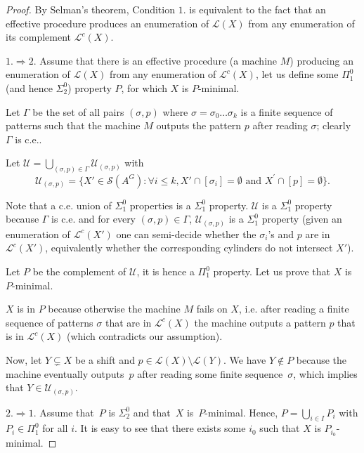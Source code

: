\documentclass[french,american]{article}
\theoremstyle{plain}
\theoremstyle{definition}
\theoremstyle{remark}
\theoremstyle{plain}
\begin{document}
\begin{proof}
By Selman's theorem, Condition $1.$ is equivalent to the fact that an effective procedure produces an enumeration of
$\mathcal{L}(X)$ from any enumeration of its complement $\mathcal{L}^{c}(X)$.

$1.\Rightarrow2$. Assume that there is an effective procedure (a
machine $M$) producing an enumeration of $\mathcal{L}(X)$ from any
enumeration of $\mathcal{L}^{c}(X)$, let us define some $\Pi_{1}^{0}$
(and hence $\Sigma_{2}^{0}$) property $P$, for which $X$ is $P$-minimal. 

Let $\varGamma$ be the set of all pairs $(\sigma,p)$ where $\sigma=\sigma_{0}\ldots\sigma_{k}$
is a finite sequence of patterns such that the machine $M$ outputs
the pattern $p$ after reading $\sigma$; clearly $\varGamma$ is
c.e.. 

Let $\mathcal{U}=\bigcup_{(\sigma,p)\in\varGamma}\mathcal{U}_{(\sigma,p)}$
with
\[
\mathcal{U}_{(\sigma,p)}=\{X'\in\mathcal{S}(A^{G}):\forall i\leq k,X'\cap[\sigma_{i}]=\emptyset\text{ and }X^{\prime}\cap[p]=\emptyset\}.
\]

Note that a c.e. union of $\Sigma_{1}^{0}$ properties is a $\Sigma_{1}^{0}$
property. $\mathcal{U}$ is a $\Sigma_{1}^{0}$ property because $\varGamma$
is c.e. and for every $(\sigma,p)\in\Gamma$, $\mathcal{U}_{(\sigma,p)}$
is a $\Sigma_{1}^{0}$ property (given an enumeration of $\mathcal{L}^{c}(X')$
one can semi-decide whether the $\sigma_{i}$'s and $p$ are in $\mathcal{L}^{c}(X')$,
equivalently whether the corresponding cylinders do not intersect
$X'$). 

Let $P$ be the complement of $\mathcal{U}$, it is hence a $\Pi_{1}^{0}$
property. Let us prove that $X$ is $P$-minimal.

$X$ is in $P$ because otherwise the machine $M$ fails on $X$,
i.e. after reading a finite sequence of patterns $\sigma$ that are
in $\mathcal{L}^{c}(X)$ the machine outputs a pattern $p$ that is
in $\mathcal{L}^{c}(X)$ (which contradicts our assumption). 

Now, let $Y\subsetneq X$ be a shift and $p \in \mathcal L(X)\setminus \mathcal L(Y)$. We have $Y\notin P$ because the machine eventually outputs~$p$ after reading some finite sequence~$\sigma$, which implies that $Y\in\mathcal{U}_{(\sigma,p)}$.

$2.\Rightarrow1$. Assume that~$P$ is $\Sigma_{2}^{0}$ and that~$X$
is~$P$-minimal. Hence, $P=\bigcup_{i\in I}P_{i}$ with $P_{i}\in\Pi_{1}^{0}$ for all $i$. It is easy to see
that there exists some $i_{0}$ such that $X$ is $P_{i_{0}}$-minimal. 


\end{proof}
\end{document}
